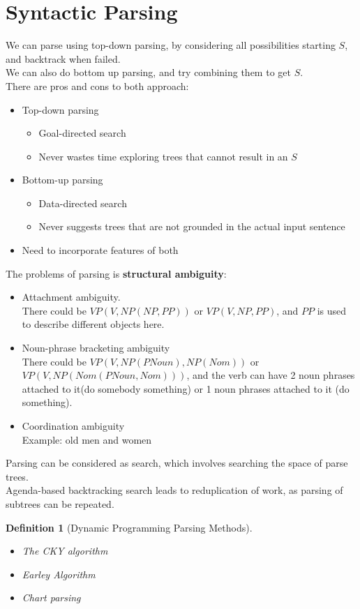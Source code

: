 \documentclass[12pt]{article}
\newtheorem{definition}{Definition}[section]
\theoremstyle{definition}
\begin{document}
\section{Syntactic Parsing}
We can parse using top-down parsing, by considering all possibilities starting $S$, and backtrack when failed.\\
We can also do bottom up parsing, and try combining them to get $S$.\\
There are pros and cons to both approach:
\begin{itemize}
	\item Top-down parsing
	\begin{itemize}
		\item Goal-directed search
		\item Never wastes time exploring trees that cannot result in an $S$
	\end{itemize}
	\item Bottom-up parsing
	\begin{itemize}
		\item Data-directed search
		\item Never suggests trees that are not grounded in the actual input sentence
	\end{itemize}
	\item Need to incorporate features of both
\end{itemize}
The problems of parsing is \textbf{structural ambiguity}:
\begin{itemize}
	\item Attachment ambiguity. \\
	There could be $VP(V, NP(NP, PP))$ or $VP(V, NP, PP)$, and $PP$ is used to describe different objects here.
	\item Noun-phrase bracketing ambiguity\\
	There could be $VP(V, NP(PNoun), NP(Nom))$ or $VP(V, NP(Nom(PNoun, Nom)))$, and the verb can have 2 noun phrases attached to it(do somebody something) or 1 noun phrases attached to it (do something).
	\item Coordination ambiguity\\
	Example: old men and women
\end{itemize}
Parsing can be considered as search, which involves searching the space of parse trees.\\
Agenda-based backtracking search leads to reduplication of work, as parsing of subtrees can be repeated.
\begin{definition}[Dynamic Programming Parsing Methods]
\hfill\\\normalfont 
\begin{itemize}
\item The CKY algorithm
\item Earley Algorithm
\item Chart parsing
\end{itemize}
\end{definition}
\end{document}
